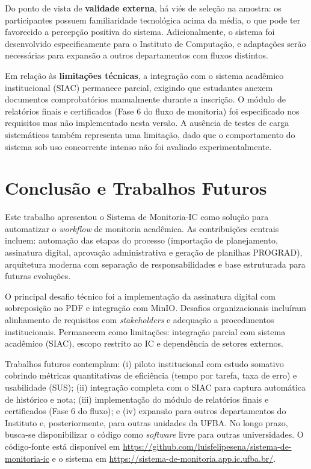 \documentclass[portuguese]{sbc2025}%
\begin{document}
Do ponto de vista de \textbf{validade externa}, há viés de seleção na amostra: os participantes possuem familiaridade tecnológica acima da média, o que pode ter favorecido a percepção positiva do sistema. Adicionalmente, o sistema foi desenvolvido especificamente para o Instituto de Computação, e adaptações serão necessárias para expansão a outros departamentos com fluxos distintos.

Em relação às \textbf{limitações técnicas}, a integração com o sistema acadêmico institucional (SIAC) permanece parcial, exigindo que estudantes anexem documentos comprobatórios manualmente durante a inscrição. O módulo de relatórios finais e certificados (Fase 6 do fluxo de monitoria) foi especificado nos requisitos mas não implementado nesta versão. A ausência de testes de carga sistemáticos também representa uma limitação, dado que o comportamento do sistema sob uso concorrente intenso não foi avaliado experimentalmente.


\FloatBarrier

\section{Conclusão e Trabalhos Futuros}
\label{sec:conclusion}

Este trabalho apresentou o Sistema de Monitoria-IC como solução para automatizar o \textit{workflow} de monitoria acadêmica. As contribuições centrais incluem: automação das etapas do processo (importação de planejamento, assinatura digital, aprovação administrativa e geração de planilhas PROGRAD), arquitetura moderna com separação de responsabilidades e base estruturada para futuras evoluções.

O principal desafio técnico foi a implementação da assinatura digital com sobreposição no PDF e integração com MinIO. Desafios organizacionais incluíram alinhamento de requisitos com \textit{stakeholders} e adequação a procedimentos institucionais. Permanecem como limitações: integração parcial com sistema acadêmico (SIAC), escopo restrito ao IC e dependência de setores externos.

Trabalhos futuros contemplam: (i) piloto institucional com estudo somativo cobrindo métricas quantitativas de eficiência (tempo por tarefa, taxa de erro) e usabilidade (SUS); (ii) integração completa com o SIAC para captura automática de histórico e nota; (iii) implementação do módulo de relatórios finais e certificados (Fase 6 do fluxo); e (iv) expansão para outros departamentos do Instituto e, posteriormente, para outras unidades da UFBA. No longo prazo, busca-se disponibilizar o código como \textit{software} livre para outras universidades. O código-fonte está disponível em \url{https://github.com/luisfelipesena/sistema-de-monitoria-ic} e o sistema em \url{https://sistema-de-monitoria.app.ic.ufba.br/}.
\end{document}
